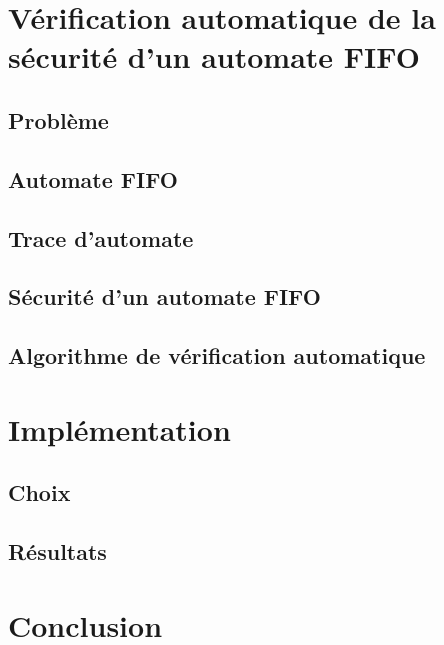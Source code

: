 	\chapter{Vérification automatique de la sécurité d'un automate FIFO}\label{ch:learning}
	\section{Problème}\label{sec:prob}%
	\section{Automate FIFO}\label{sec:fifo}
	\section{Trace d'automate}\label{sec:trace}%
	\section{Sécurité d'un automate FIFO}\label{sec:unsafe}%
	\section{Algorithme de vérification automatique}\label{sec:algo}%

	\chapter{Implémentation}\label{ch:impl}
	\section{Choix}\label{sec:choix}
	\section{Résultats}\label{sec:res}

	\chapter{Conclusion}\label{ch:ccl}


	\newpage
	
	


